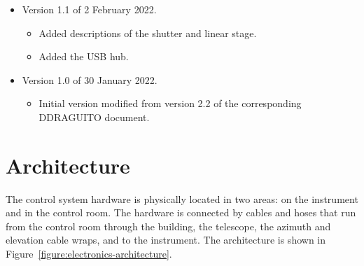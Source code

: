 \documentclass{article}
\begin{document}
\begin{itemize}
\item Version 1.1 of 2 February 2022.
\begin{itemize}
    \item Added descriptions of the shutter and linear stage.
    \item Added the USB hub.
\end{itemize}

\item Version 1.0 of 30 January 2022.
\begin{itemize}
    \item Initial version modified from version 2.2 of the corresponding DDRAGUITO document.
\end{itemize}

\end{itemize}


\newpage

\pagestyle{plain}

\tableofcontents

\clearpage
\section{Architecture}

The control system hardware is physically located in two areas: on the instrument and in the control room. The hardware is connected by cables and hoses that run from the control room through the building, the telescope, the azimuth and elevation cable wraps, and to the instrument. The architecture is shown in Figure~\ref{figure:electronics-architecture}.
\end{document}
